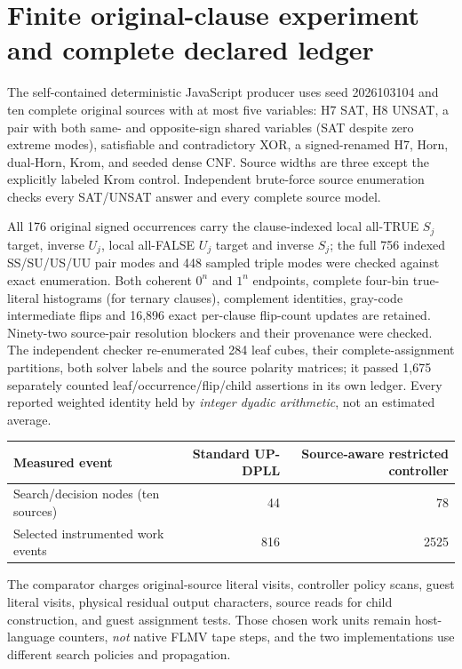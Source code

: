 \documentclass[11pt]{article}
\begin{document}
\section{Finite original-clause experiment and complete declared ledger}
The self-contained deterministic JavaScript producer uses seed 2026103104 and ten complete original sources with at most five variables: H7 SAT, H8 UNSAT, a pair with both same- and opposite-sign shared variables (SAT despite zero extreme modes), satisfiable and contradictory XOR, a signed-renamed H7, Horn, dual-Horn, Krom, and seeded dense CNF. Source widths are three except the explicitly labeled Krom control. Independent brute-force source enumeration checks every SAT/UNSAT answer and every complete source model.

All 176 original signed occurrences carry the clause-indexed local all-TRUE $S_j$ target, inverse $U_j$, local all-FALSE $U_j$ target and inverse $S_j$; the full 756 indexed SS/SU/US/UU pair modes and 448 sampled triple modes were checked against exact enumeration. Both coherent $0^n$ and $1^n$ endpoints, complete four-bin true-literal histograms (for ternary clauses), complement identities, gray-code intermediate flips and 16,896 exact per-clause flip-count updates are retained. Ninety-two source-pair resolution blockers and their provenance were checked. The independent checker re-enumerated 284 leaf cubes, their complete-assignment partitions, both solver labels and the source polarity matrices; it passed 1,675 separately counted leaf/occurrence/flip/child assertions in its own ledger. Every reported weighted identity held by \emph{integer dyadic arithmetic}, not an estimated average.

\begin{center}\begin{tabular}{lrr}
\toprule
Measured event & Standard UP-DPLL & Source-aware restricted controller\\
\midrule
Search/decision nodes (ten sources) &44&78\\
Selected instrumented work events &816&2525\\
\bottomrule
\end{tabular}\end{center}
The comparator charges original-source literal visits, controller policy scans, guest literal visits, physical residual output characters, source reads for child construction, and guest assignment tests. Those chosen work units remain host-language counters, \emph{not} native FLMV tape steps, and the two implementations use different search policies and propagation.
\end{document}
